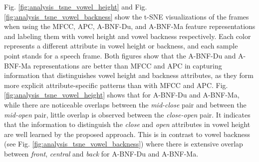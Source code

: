 \documentclass[transmag]{IEEEtran}
\begin{document}


Fig. \ref{fig:analysis_tsne_vowel_height} and Fig. \ref{fig:analysis_tsne_vowel_backness} show the t-SNE visualizations of the frames when using the MFCC, APC, A-BNF-Du, and A-BNF-Ma feature representations and labeling them with vowel height and vowel backness respectively. Each color represents a different attribute in vowel height or backness, and each sample point stands for a speech frame.
Both figures show that the A-BNF-Du and A-BNF-Ma representations are better than MFCC and APC in capturing information that distinguishes vowel height and backness attributes, as they form more explicit attribute-specific patterns than with MFCC and APC.
Fig. \ref{fig:analysis_tsne_vowel_height} shows that for A-BNF-Du and A-BNF-Ma, while there are noticeable overlaps between the \textit{mid-close} pair and between the \textit{mid-open} pair, little overlap is observed between the \textit{close-open} pair.  It indicates that the information to distinguish the \textit{close} and \textit{open} attributes in vowel height are well learned by the proposed approach. This is in contrast to vowel backness (see Fig. \ref{fig:analysis_tsne_vowel_backness}) where there is extensive overlap between \textit{front},  \textit{central} and \textit{back} for A-BNF-Du and A-BNF-Ma.

\end{document}
